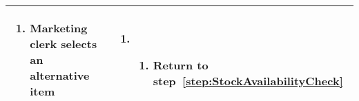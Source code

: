\documentclass[12pt,a4paper]{article}
\newcounter{stockAvailabilityCheck}
\begin{document}
\begin{longtable}{|p{}|p{}|}
\begin{enumerate}[start=\value{stockAvailabilityCheck}]
\begin{enumerate}[resume=abnormal1]
        \item Marketing clerk selects an alternative item
      \end{enumerate}
  \end{enumerate}
  &
  \begin{enumerate}[start=\value{stockAvailabilityCheck}]
    \item
      \begin{enumerate}[resume=abnormal1]
        \item Return to step~\ref{step:StockAvailabilityCheck}
      \end{enumerate}
  \end{enumerate} \\\hline
\end{longtable}
\end{document}
